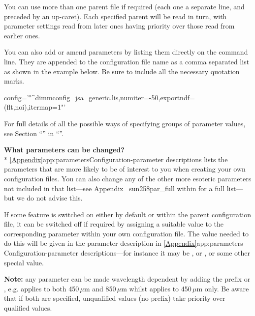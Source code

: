 You can use more than one parent file if required (each one a separate
line, and preceded by an up-caret). Each specified parent will be read in
turn, with parameter settings read from later ones having priority over
those read from earlier ones.

You can also add or amend parameters by listing them directly on the
command line. They are appended to the configuration file name as a
comma separated list as shown in the example below. Be sure to include
all the necessary quotation marks.

\begin{terminalv}
       config='"^dimmconfig_jsa_generic.lis,numiter=-50,exportndf=(flt,noi),itermap=1"'
\end{terminalv}

For full details of all the possible ways of specifying groups of
parameter values, see Section ``'' in ``''.

\textbf{What parameters can be changed?}\\*
\cref{Appendix}{app:parameters}{Configuration-parameter descriptions}
lists the parameters that are more likely to be of interest to you when
creating your own configuration files. You can also change any of the
other more esoteric parameters not included in that list---see
Appendix~ {sun258}{par_full} within  for a full list---but we do not advise this.

\begin{tip}
  If some feature is switched on either by default or within
  the parent configuration file, it can be switched off if required
  by assigning a suitable value to the corresponding parameter within
  your own configuration file. The value needed to do this will be
  given in the parameter description in \cref{Appendix}{app:parameters}
  {Configuration-parameter descriptions}---for instance it may be
  , or , or some other special value.
\end{tip}

\textbf{Note:} any parameter can be made wavelength dependent by
adding the prefix  or , e.g.
 applies to both 450\,$\mu$m and
850\,$\mu$m whilst  applies to
450\,$\mu$m only. Be aware that if both are specified, unqualified
values (no prefix) take priority over qualified values.

